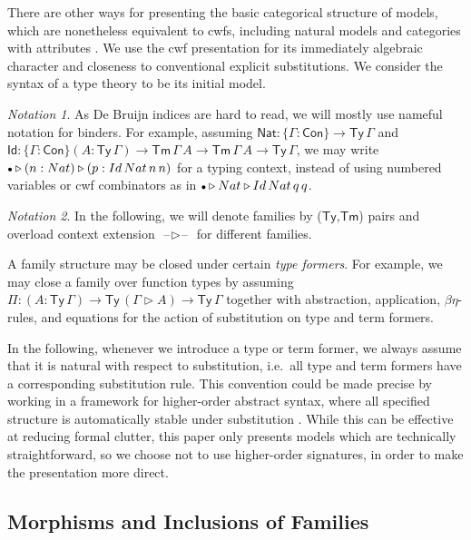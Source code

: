 \documentclass[a4paper,UKenglish,cleveref, autoref, thm-restate]{lipics-v2021}
\theoremstyle{remark}
\newtheorem{notation}{Notation}
\theoremstyle{definition}
\newcommand{\Con}{\mathsf{Con}}
\newcommand{\Ty}{\mathsf{Ty}}
\newcommand{\Tm}{\mathsf{Tm}}
\newcommand{\emptycon}{\scaleobj{.75}\bullet}
\newcommand{\ext}{\triangleright}
\newcommand{\blank}{\mathord{\hspace{1pt}\text{--}\hspace{1pt}}}
\newcommand{\q}{\mathsf{q}}
\newcommand{\Id}{\mathsf{Id}}
\newcommand{\Nat}{\mathsf{Nat}}
\begin{document}
There are other ways for presenting the basic categorical structure of models,
which are nonetheless equivalent to cwfs, including natural models
\cite{awodey18natural} and categories with attributes \cite{cartmellthesis}. We
use the cwf presentation for its immediately algebraic character and closeness
to conventional explicit substitutions. We consider the syntax of a type theory
to be its initial model.

\begin{notation}As De Bruijn indices are hard to read, we will mostly use
nameful notation for binders. For example, assuming $\Nat : \{\Gamma : \Con\}
\to \Ty\,\Gamma$ and $\Id : \{\Gamma : \Con\}(A : \Ty\,\Gamma) \to
\Tm\,\Gamma\,A \to \Tm\,\Gamma\,A \to \Ty\,\Gamma$, we may write $\emptycon \ext
(n : \Nat) \ext (p : \Id\,\Nat\,n\,n)$ for a typing context, instead of using
numbered variables or cwf combinators as in $\emptycon \ext \Nat \ext
\Id\,\Nat\,\q\,\q$.
\end{notation}

\begin{notation}
In the following, we will denote families by ($\Ty$,$\Tm$) pairs and overload context
extension $\blank\ext\blank$ for different families.
\end{notation}

A family structure may be closed under certain \emph{type formers}. For example,
we may close a family over function types by assuming $\Pi : (A : \Ty\,\Gamma)
\to \Ty\,(\Gamma\ext A) \to \Ty\,\Gamma$ together with abstraction, application,
$\beta\eta$-rules, and equations for the action of substitution on type and term
formers.

In the following, whenever we introduce a type or term former, we always assume
that it is natural with respect to substitution, i.e.\ all type and term formers
have a corresponding substitution rule. This convention could be made precise by
working in a framework for higher-order abstract syntax, where all specified
structure is automatically stable under substitution
\cite{cubicalnorm,uemura,bocquet2021relative}. While this can be effective at
reducing formal clutter, this paper only presents models which are technically
straightforward, so we choose not to use higher-order signatures, in order to
make the presentation more direct.

\subsection{Morphisms and Inclusions of Families}
\label{sec:morphisms}
\end{document}

